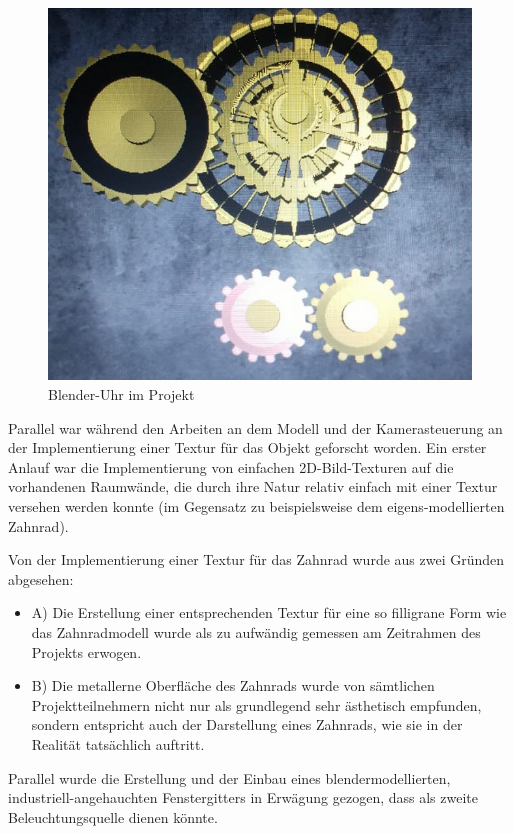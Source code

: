 \documentclass{article}
\begin{document}
\begin{figure}[h!]
\centering
\includegraphics[scale=0.8]{res/finalClock.png}
\caption{Blender-Uhr im Projekt}
\label{fig:finalClock}
\end{figure}

Parallel war während den Arbeiten an dem Modell und der Kamerasteuerung an der Implementierung einer Textur für das Objekt geforscht worden. 
Ein erster Anlauf war die Implementierung von einfachen 2D-Bild-Texturen auf die vorhandenen Raumwände, die durch ihre Natur relativ einfach mit einer Textur versehen werden konnte (im Gegensatz zu beispielsweise dem eigens-modellierten Zahnrad). 

Von der Implementierung einer Textur für das Zahnrad wurde aus zwei Gründen abgesehen: 

\begin{itemize}
    \item A) Die Erstellung einer entsprechenden Textur für eine so filligrane Form wie das Zahnradmodell wurde als zu aufwändig gemessen am Zeitrahmen des Projekts erwogen. 
    \item B) Die metallerne Oberfläche des Zahnrads wurde von sämtlichen Projektteilnehmern nicht nur als grundlegend sehr ästhetisch empfunden, sondern entspricht auch der Darstellung eines Zahnrads, wie sie in der Realität tatsächlich auftritt. 
\end{itemize}

Parallel wurde die Erstellung und der Einbau eines blendermodellierten, industriell-angehauchten Fenstergitters in Erwägung gezogen, dass als zweite Beleuchtungsquelle dienen könnte. 
\end{document}
